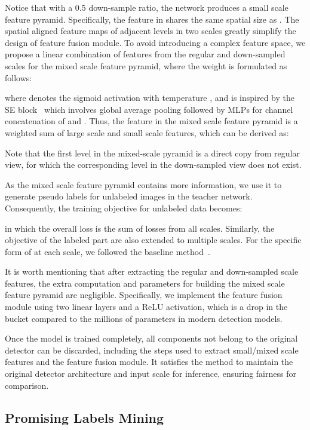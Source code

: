 \documentclass[10pt,twocolumn,letterpaper]{article}
\begin{document}
Notice that with a 0.5 down-sample ratio, the network produces a small scale feature pyramid. Specifically, the feature in  shares the same spatial size as . The spatial aligned feature maps of adjacent levels in two scales greatly simplify the design of feature fusion module. To avoid introducing a complex feature space, we propose a linear combination of features from the regular and down-sampled scales for the mixed scale feature pyramid, where the weight is formulated as follows:

where  denotes the sigmoid activation with temperature , and  is inspired by the SE block~\cite{SENet} which involves global average pooling followed by MLPs for channel concatenation of  and . Thus, the feature  in the mixed scale feature pyramid is a weighted sum of large scale and small scale features, which can be derived as:

Note that the first level in the mixed-scale pyramid is a direct copy from regular view, for which the corresponding level in the down-sampled view does not exist.

As the mixed scale feature pyramid contains more information, we use it to generate pseudo labels for unlabeled images in the teacher network. Consequently, the training objective for unlabeled data becomes:
 
in which the overall loss is the sum of losses from all scales. Similarly, the objective of the labeled part are also extended to multiple scales. For the specific form of  at each scale, we followed the baseline method~\cite{softTeacher}.






It is worth mentioning that after extracting the regular and down-sampled scale features, the extra computation and parameters for building the mixed scale feature pyramid are negligible. Specifically, we implement the feature fusion module using two linear layers and a ReLU activation, which is a drop in the bucket compared to the millions of parameters in modern detection models.

Once the model is trained completely, all components not belong to the original detector can be discarded, including the steps used to extract small/mixed scale features and the feature fusion module. It satisfies the method to maintain the original detector architecture and input scale for inference, ensuring fairness for comparison.



\subsection{Promising Labels Mining}
\end{document}

